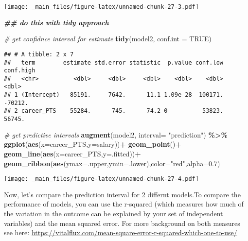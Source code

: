 \documentclass[
]{book}
\newenvironment{Shaded}{\begin{snugshade}}{\end{snugshade}}
\newcommand{\AttributeTok}[1]{\textcolor[rgb]{0.13,0.29,0.53}{#1}}
\newcommand{\CommentTok}[1]{\textcolor[rgb]{0.56,0.35,0.01}{\textit{#1}}}
\newcommand{\ConstantTok}[1]{\textcolor[rgb]{0.56,0.35,0.01}{#1}}
\newcommand{\DocumentationTok}[1]{\textcolor[rgb]{0.56,0.35,0.01}{\textbf{\textit{#1}}}}
\newcommand{\FloatTok}[1]{\textcolor[rgb]{0.00,0.00,0.81}{#1}}
\newcommand{\FunctionTok}[1]{\textcolor[rgb]{0.13,0.29,0.53}{\textbf{#1}}}
\newcommand{\NormalTok}[1]{#1}
\newcommand{\SpecialCharTok}[1]{\textcolor[rgb]{0.81,0.36,0.00}{\textbf{#1}}}
\newcommand{\StringTok}[1]{\textcolor[rgb]{0.31,0.60,0.02}{#1}}
\begin{document}
\texttt{[image: \_main\_files/figure-latex/unnamed-chunk-27-3.pdf]}

\begin{Shaded}
\begin{Highlighting}[]
\DocumentationTok{\#\# do this with tidy approach}

\CommentTok{\# get confidnce interval for estimate}
\FunctionTok{tidy}\NormalTok{(model2, }\AttributeTok{conf.int =} \ConstantTok{TRUE}\NormalTok{)}
\end{Highlighting}
\end{Shaded}

\begin{verbatim}
## # A tibble: 2 x 7
##   term        estimate std.error statistic  p.value conf.low conf.high
##   <chr>          <dbl>     <dbl>     <dbl>    <dbl>    <dbl>     <dbl>
## 1 (Intercept)  -85191.     7642.     -11.1 1.09e-28 -100171.   -70212.
## 2 career_PTS    55284.      745.      74.2 0          53823.    56745.
\end{verbatim}

\begin{Shaded}
\begin{Highlighting}[]
\CommentTok{\# get predictive intervals}
\FunctionTok{augment}\NormalTok{(model2, }\AttributeTok{interval=} \StringTok{"prediction"}\NormalTok{) }\SpecialCharTok{\%\textgreater{}\%}
  \FunctionTok{ggplot}\NormalTok{(}\FunctionTok{aes}\NormalTok{(}\AttributeTok{x=}\NormalTok{career\_PTS,}\AttributeTok{y=}\NormalTok{salary))}\SpecialCharTok{+}
  \FunctionTok{geom\_point}\NormalTok{()}\SpecialCharTok{+}
  \FunctionTok{geom\_line}\NormalTok{(}\FunctionTok{aes}\NormalTok{(}\AttributeTok{x=}\NormalTok{career\_PTS,}\AttributeTok{y=}\NormalTok{.fitted))}\SpecialCharTok{+}
  \FunctionTok{geom\_ribbon}\NormalTok{(}\FunctionTok{aes}\NormalTok{(}\AttributeTok{ymax=}\NormalTok{.upper,}\AttributeTok{ymin=}\NormalTok{.lower),}\AttributeTok{color=}\StringTok{"red"}\NormalTok{,}\AttributeTok{alpha=}\FloatTok{0.7}\NormalTok{)}
\end{Highlighting}
\end{Shaded}

\texttt{[image: \_main\_files/figure-latex/unnamed-chunk-27-4.pdf]}

Now, let's compare the prediction interval for 2 differnt models.To compare the performance of models, you can use the r-squared (which measures how much of the variation in the outcome can be explained by your set of independent variables) and the mean squared error. For more background on both measures see here: \url{https://vitalflux.com/mean-square-error-r-squared-which-one-to-use/}
\end{document}

